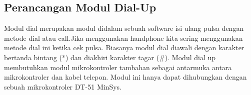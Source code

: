 \documentclass[12pt,a4paper]{article}
\begin{document}
\subsection{Perancangan Modul Dial-Up}
Modul dial merupakan modul didalam sebuah software isi ulang pulsa dengan metode dial atau call.Jika menggunakan handphone kita sering menggunakan metode dial ini ketika cek pulsa. Biasanya modul dial diawali dengan karakter bertanda bintang (*) 
dan diakhiri karakter tagar (#).  Modul dial up membutuhkan modul mikrokontroler tambahan 
sebagai antarmuka antara mikrokontroler dan kabel telepon. Modul ini hanya dapat dihubungkan dengan 
sebuah mikrokontroler DT-51 MinSys.
\end{document}
